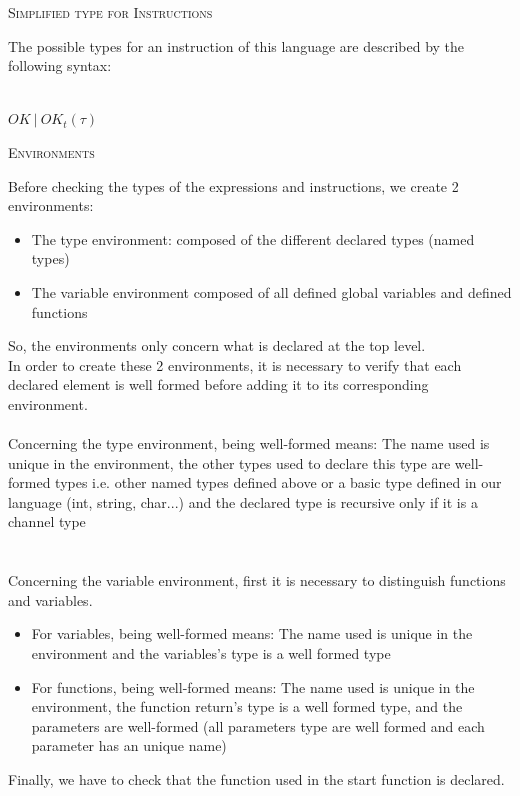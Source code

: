 \documentclass[11pt]{report}
\begin{document}
\vspace*{10pt}
{}
\tabto{1cm} {\Large \textsc{Simplified type for Instructions}}

\tabto{0cm}The possible types for an instruction of this language are described by the following syntax:
\\ \\
\centerline{$OK \ | \ OK_t(\tau)$}

\vspace*{10pt}
{}
\tabto{1cm} {\Large \textsc{ Environments}}

\tabto{0cm} Before checking the types of the expressions and instructions, we create 2 environments:
\begin{itemize}
\item The type environment: composed of the different declared types (named types)
\item The variable environment composed of all defined global variables and defined functions
\end{itemize}
So, the environments only concern what is declared at the top level.\\

In order to create these 2 environments, it is necessary to verify that each declared element is well formed before adding it to its corresponding environment.\\ \\
Concerning the type environment, being well-formed means: 
The name used is unique in the environment, the other types used to declare this type are well-formed types i.e. other named types defined above or a basic type defined in our language (int, string, char...) and the declared type is recursive only if it is a channel type\\ \\ \\
Concerning the variable environment, first it is  necessary to distinguish functions and variables.
\begin{itemize}
    \item  For variables, being well-formed means: The name used is unique in the environment and the variables's type is a well formed type
    \item For functions, being well-formed means: The name used is unique in the environment, the function return's type is a well formed type, and the parameters are well-formed (all parameters type are well formed and each parameter has an unique name)
\end{itemize}
Finally, we have to check that the function used in the start function is declared.
\end{document}

